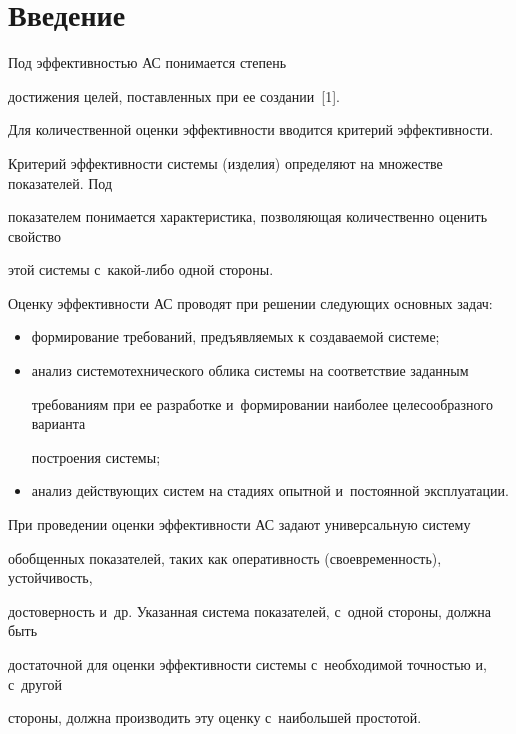 \section{Введение}



      Под эффективностью АС понимается степень 

достижения целей, поставленных при ее создании~[1]. 

      

      Для количественной оценки эффективности вводится критерий эффективности. 

Критерий эффективности системы (изделия) определяют на множестве показателей. Под 

показателем понимается характеристика, позволяющая количественно оценить свойство 

этой системы с~какой-либо одной стороны. 

      

      Оценку эффективности АС проводят при решении следующих основных задач:

      \begin{itemize}

\item формирование требований, предъявляемых к создаваемой системе;

      \item анализ системотехнического облика системы на соответствие заданным 

требованиям при ее разработке и~формировании наиболее целесообразного варианта 

построения системы;

      \item анализ действующих систем на стадиях опытной и~постоянной эксплуатации.

      \end{itemize}

      

      При проведении оценки эффективности АС задают универсальную систему 

обобщенных показателей, таких как оперативность (своевременность), устойчивость, 

достоверность и~др. Указанная система показателей, с~одной стороны, должна быть 

достаточной для оценки эффективности системы с~необходимой точностью и, с~другой 

стороны, должна производить эту оценку с~наибольшей простотой. 

